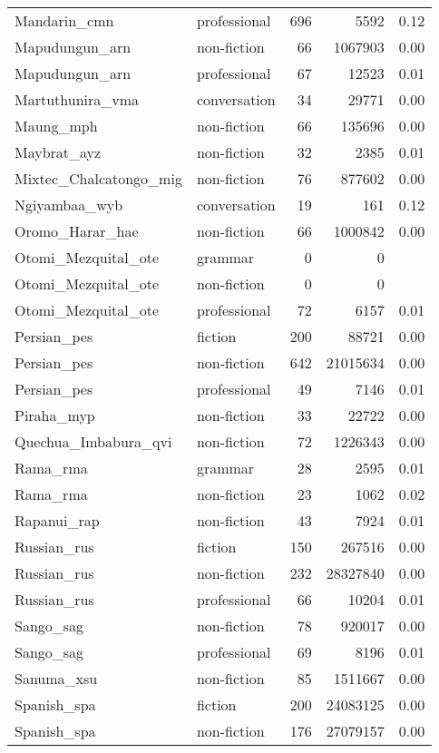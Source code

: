 \begin{longtable}{llrrr}
  Mandarin\_cmn & professional & 696 & 5592 & 0.12 \\ 
  Mapudungun\_arn & non-fiction & 66 & 1067903 & 0.00 \\ 
  Mapudungun\_arn & professional & 67 & 12523 & 0.01 \\ 
  Martuthunira\_vma & conversation & 34 & 29771 & 0.00 \\ 
  Maung\_mph & non-fiction & 66 & 135696 & 0.00 \\ 
  Maybrat\_ayz & non-fiction & 32 & 2385 & 0.01 \\ 
  Mixtec\_Chalcatongo\_mig & non-fiction & 76 & 877602 & 0.00 \\ 
  Ngiyambaa\_wyb & conversation & 19 & 161 & 0.12 \\ 
  Oromo\_Harar\_hae & non-fiction & 66 & 1000842 & 0.00 \\ 
  Otomi\_Mezquital\_ote & grammar & 0 & 0 &  \\ 
  Otomi\_Mezquital\_ote & non-fiction & 0 & 0 &  \\ 
  Otomi\_Mezquital\_ote & professional & 72 & 6157 & 0.01 \\ 
  Persian\_pes & fiction & 200 & 88721 & 0.00 \\ 
  Persian\_pes & non-fiction & 642 & 21015634 & 0.00 \\ 
  Persian\_pes & professional & 49 & 7146 & 0.01 \\ 
  Piraha\_myp & non-fiction & 33 & 22722 & 0.00 \\ 
  Quechua\_Imbabura\_qvi & non-fiction & 72 & 1226343 & 0.00 \\ 
  Rama\_rma & grammar & 28 & 2595 & 0.01 \\ 
  Rama\_rma & non-fiction & 23 & 1062 & 0.02 \\ 
  Rapanui\_rap & non-fiction & 43 & 7924 & 0.01 \\ 
  Russian\_rus & fiction & 150 & 267516 & 0.00 \\ 
  Russian\_rus & non-fiction & 232 & 28327840 & 0.00 \\ 
  Russian\_rus & professional & 66 & 10204 & 0.01 \\ 
  Sango\_sag & non-fiction & 78 & 920017 & 0.00 \\ 
  Sango\_sag & professional & 69 & 8196 & 0.01 \\ 
  Sanuma\_xsu & non-fiction & 85 & 1511667 & 0.00 \\ 
  Spanish\_spa & fiction & 200 & 24083125 & 0.00 \\ 
  Spanish\_spa & non-fiction & 176 & 27079157 & 0.00 \\ 

\end{longtable}
